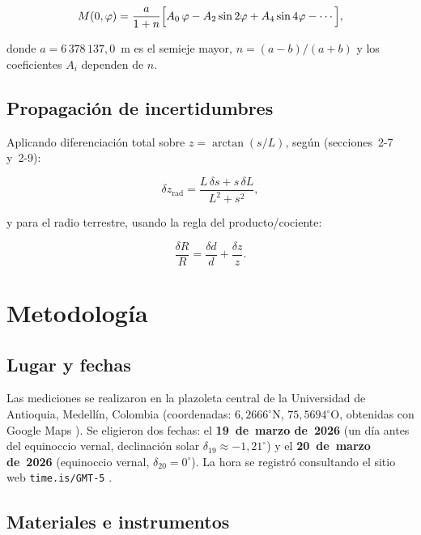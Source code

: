 \documentclass[12pt,a4paper]{article}
\begin{document}
\begin{equation}
  M(0,\varphi) = \frac{a}{1+n}
  \Bigl[A_0\,\varphi - A_2\sin 2\varphi
        + A_4\sin 4\varphi - \cdots\Bigr],
  \label{eq:helmert}
\end{equation}

donde $a = 6\,378\,137{,}0$~m es el semieje mayor, $n = (a-b)/(a+b)$
y los coeficientes $A_i$ dependen de $n$.

\subsection{Propagación de incertidumbres}

Aplicando diferenciación total sobre $z = \arctan(s/L)$,
según \citet{Baird1991} (secciones~2-7 y~2-9):

\begin{equation}
  \delta z_\text{rad}
  = \frac{L\,\delta s + s\,\delta L}{L^2 + s^2},
  \label{eq:delta_z}
\end{equation}

y para el radio terrestre, usando la regla del producto/cociente:

\begin{equation}
  \frac{\delta R}{R} = \frac{\delta d}{d} + \frac{\delta z}{z}.
  \label{eq:delta_R}
\end{equation}

\section{Metodología}

\subsection{Lugar y fechas}

Las mediciones se realizaron en la plazoleta central de la
Universidad de Antioquia, Medellín, Colombia
(coordenadas: $6{,}2666^\circ\text{N}$, $75{,}5694^\circ\text{O}$,
obtenidas con Google Maps \citep{GoogleMaps2026}).
Se eligieron dos fechas: el \textbf{19~de~marzo de~2026} (un día antes
del equinoccio vernal, declinación solar $\delta_{19} \approx -1{,}21^\circ$)
y el \textbf{20~de~marzo de~2026} (equinoccio vernal,
$\delta_{20} = 0^\circ$).
La hora se registró consultando el sitio web \texttt{time.is/GMT-5}
\citep{TimeIs2026}.

\subsection{Materiales e instrumentos}
\end{document}
